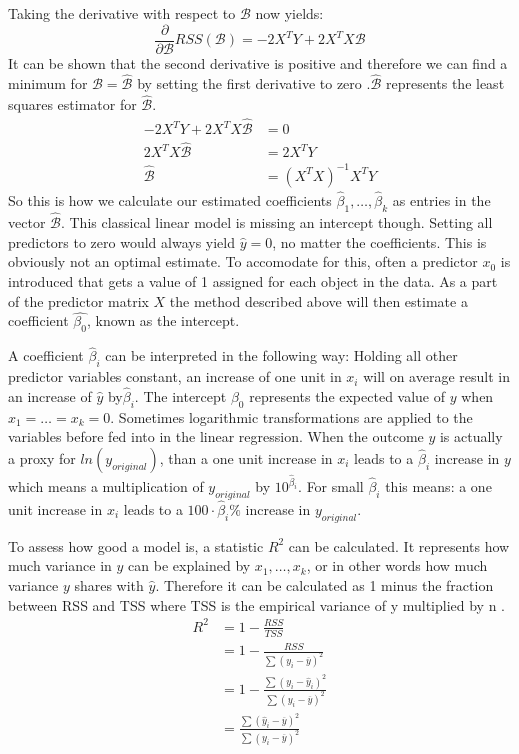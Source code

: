 \documentclass[12 pt]{scrartcl}
\begin{document}
Taking the derivative with respect to $\mathcal{B}$ now yields:
\[ \frac{\partial}{\partial \mathcal{B}} RSS(\mathcal{B}) = -2X^TY + 2X^TX\mathcal{B}\]
It can be shown that the second derivative is positive and therefore we can find a minimum for $\mathcal{B} = \hat{\mathcal{B}}$ by setting the first derivative to zero \citep[p.~106]{fahrmeir2013regression}.$\hat{\mathcal{B}}$ represents the least squares estimator for $\hat{\mathcal{B}}$.
\begin{equation} \label{eq3}
  \begin{split}
    -2X^TY + 2X^TX\hat{\mathcal{B}} & = 0 \\
    2X^TX\hat{\mathcal{B}}    & =2X^TY \\
    \hat{\mathcal{B}}  & =(X^TX)^{-1}X^TY
  \end{split}
\end{equation}
So this is how we calculate our estimated coefficients $\hat{\beta}_1, \dots, \hat{\beta}_k$ as entries in the vector $\hat{\mathcal{B}}$. This classical linear model is missing an intercept though. Setting all predictors to zero would always yield $\hat{y} = 0$, no matter the coefficients. This is obviously not an optimal estimate. To accomodate for this, often a predictor $x_0$ is introduced that gets a value of 1 assigned for each object in the data. As a part of the predictor matrix $X$ the method described above will then estimate a coefficient $\hat{\beta_0}$, known as the intercept.

A coefficient $\hat{\beta}_i$ can be interpreted in the following way: Holding all other predictor variables constant, an increase of one unit in $x_i$ will on average result in an increase of $\hat{y}$ by$\hat{\beta}_i$. The intercept $\beta_0$ represents the expected value of $y$ when $x_1 = \dots = x_k = 0$.
Sometimes logarithmic transformations are applied to the variables before fed into in the linear regression. When the outcome $y$ is actually a proxy for $ln(y_{original})$, than a one unit increase in $x_i$ leads to a $\hat{\beta}_i$ increase in $y$ which means a multiplication of $y_{original}$ by $10^{\hat{\beta}_i}$. For small $\hat{\beta}_i$ this means: a one unit increase in $x_i$ leads to a $100 \cdot \hat{\beta}_i \%$ increase in $y_{original}$.

To assess how good a model is, a statistic $R^2$ can be calculated. It represents how much variance in $y$ can be explained by $x_1, \dots , x_k$, or in other words how much variance $y$ shares with $\hat{y}$. Therefore it can be calculated as 1 minus the fraction between RSS and TSS where TSS is the empirical variance of y multiplied by n \citep[p.~234]{james2013introduction}.
\begin{equation} \label{eqrsquared}
  \begin{split}
    R^2  & = 1-\frac{RSS}{TSS} \\
    & = 1-\frac{RSS}{\sum{(y_i - \overline{y})^2}} \\
    & = 1-\frac{\sum{(y_i - \hat{y}_i)^2}}{\sum{(y_i - \overline{y})^2}} \\
    & = \frac{\sum{(\hat{y}_i -\overline{y})^2}}{\sum{(y_i - \overline{y})^2}}
  \end{split}
\end{equation}
\end{document}
